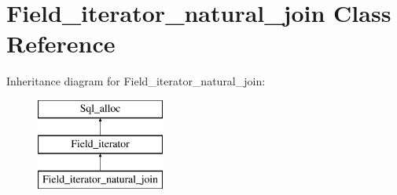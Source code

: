 \hypertarget{classField__iterator__natural__join}{}\section{Field\+\_\+iterator\+\_\+natural\+\_\+join Class Reference}
\label{classField__iterator__natural__join}
Inheritance diagram for Field\+\_\+iterator\+\_\+natural\+\_\+join\+:\begin{figure}[H]
\begin{center}
\leavevmode
\includegraphics[height=3.000000cm]{classField__iterator__natural__join}
\end{center}
\end{figure}
